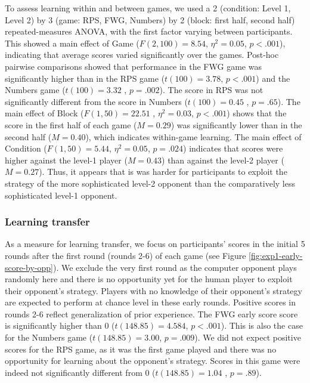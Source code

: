 \documentclass[
  english,
  man,floatsintext]{apa6}
\begin{document}
To assess learning within and between games, we used a 2 (condition: Level 1, Level 2) by 3 (game: RPS, FWG, Numbers) by 2 (block: first half, second half) repeated-measures ANOVA, with the first factor varying between participants. This showed a main effect of Game (\(F(2,100) = 8.54\), \(\eta^{2} = 0.05\), \(p < .001\)), indicating that average scores varied significantly over the games. Post-hoc pairwise comparisons showed that performance in the FWG game was significantly higher than in the RPS game (\(t(100) =3.78\), \(p < .001\)) and the Numbers game (\(t(100) = 3.32\) , \(p = .002\)). The score in RPS was not significantly different from the score in Numbers (\(t(100) = 0.45\) , \(p = .65\)). The main effect of Block (\(F(1,50) = 22.51\) , \(\eta^{2} = 0.03\), \(p < .001\)) shows that the score in the first half of each game (\(M = 0.29\)) was significantly lower than in the second half (\(M = 0.40\)), which indicates within-game learning. The main effect of Condition (\(F(1,50) = 5.44\), \(\eta^{2} = 0.05\), \(p = .024\)) indicates that scores were higher against the level-1 player (\(M = 0.43\)) than against the level-2 player (\(M = 0.27\)). Thus, it appears that is was harder for participants to exploit the strategy of the more sophisticated level-2 opponent than the comparatively less sophisticated level-1 opponent.

\hypertarget{learning-transfer}{%
\subsubsection{Learning transfer}\label{learning-transfer}}

As a measure for learning transfer, we focus on participants' scores in the initial 5 rounds after the first round (rounds 2-6) of each game (see Figure \ref{fig:exp1-early-score-by-opp}). We exclude the very first round as the computer opponent plays randomly here and there is no opportunity yet for the human player to exploit their opponent's strategy. Players with no knowledge of their opponent's strategy are expected to perform at chance level in these early rounds. Positive scores in rounds 2-6 reflect generalization of prior experience. The FWG early score score is significantly higher than 0 (\(t(148.85) = 4.584\), \(p < .001\)). This is also the case for the Numbers game (\(t(148.85) = 3.00\), \(p = .009\)). We did not expect positive scores for the RPS game, as it was the first game played and there was no opportunity for learning about the opponent's strategy. Scores in this game were indeed not significantly different from 0 (\(t(148.85) = 1.04\) , \(p = .89\)).
\end{document}
